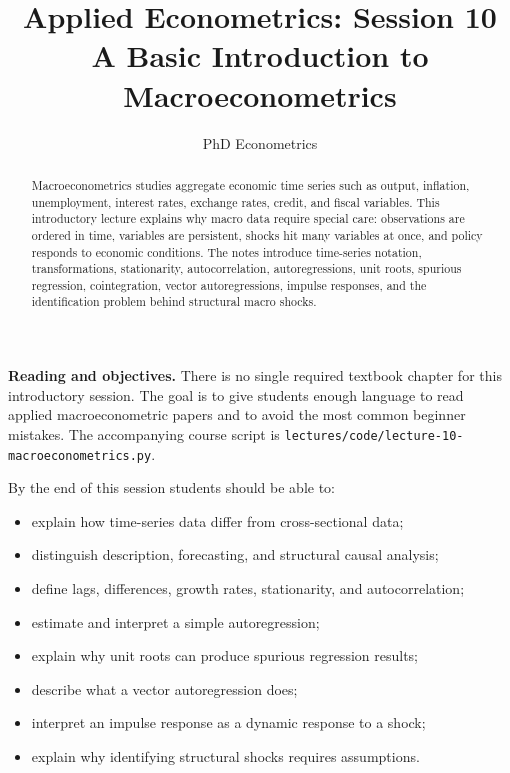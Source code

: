 

\newcommand{\Corr}{\mathrm{Corr}}

\title{Applied Econometrics: Session 10\\A Basic Introduction to Macroeconometrics}
\author{PhD Econometrics}
\date{}



\maketitle

\begin{abstract}
Macroeconometrics studies aggregate economic time series such as output, inflation, unemployment, interest rates, exchange rates, credit, and fiscal variables. This introductory lecture explains why macro data require special care: observations are ordered in time, variables are persistent, shocks hit many variables at once, and policy responds to economic conditions. The notes introduce time-series notation, transformations, stationarity, autocorrelation, autoregressions, unit roots, spurious regression, cointegration, vector autoregressions, impulse responses, and the identification problem behind structural macro shocks.
\end{abstract}

\begin{boxD}
\textbf{Reading and objectives.} There is no single required textbook chapter for this introductory session. The goal is to give students enough language to read applied macroeconometric papers and to avoid the most common beginner mistakes. The accompanying course script is \texttt{lectures/code/lecture-10-macroeconometrics.py}.

By the end of this session students should be able to:
\begin{itemize}
    \item explain how time-series data differ from cross-sectional data;
    \item distinguish description, forecasting, and structural causal analysis;
    \item define lags, differences, growth rates, stationarity, and autocorrelation;
    \item estimate and interpret a simple autoregression;
    \item explain why unit roots can produce spurious regression results;
    \item describe what a vector autoregression does;
    \item interpret an impulse response as a dynamic response to a shock;
    \item explain why identifying structural shocks requires assumptions.
\end{itemize}
\end{boxD}

